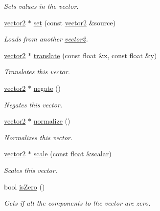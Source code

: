 \begin{DoxyCompactItemize}
\begin{DoxyCompactList}\small\item\em Sets values in the vector. \end{DoxyCompactList}\item 
\hyperlink{classflounder_1_1vector2}{vector2} $\ast$ \hyperlink{classflounder_1_1vector2_a4b553633e18fa6aafc1a5407fcf1e502}{set} (const \hyperlink{classflounder_1_1vector2}{vector2} \&source)
\begin{DoxyCompactList}\small\item\em Loads from another \hyperlink{classflounder_1_1vector2}{vector2}. \end{DoxyCompactList}\item 
\hyperlink{classflounder_1_1vector2}{vector2} $\ast$ \hyperlink{classflounder_1_1vector2_a8795f9c2519a2b0e3da92a06d57e7678}{translate} (const float \&x, const float \&y)
\begin{DoxyCompactList}\small\item\em Translates this vector. \end{DoxyCompactList}\item 
\hyperlink{classflounder_1_1vector2}{vector2} $\ast$ \hyperlink{classflounder_1_1vector2_a0fa7eef12302eaa8cd4f4ff030231e3d}{negate} ()
\begin{DoxyCompactList}\small\item\em Negates this vector. \end{DoxyCompactList}\item 
\hyperlink{classflounder_1_1vector2}{vector2} $\ast$ \hyperlink{classflounder_1_1vector2_a6b47b4d4a39f7a3465e03ee74299ebbe}{normalize} ()
\begin{DoxyCompactList}\small\item\em Normalizes this vector. \end{DoxyCompactList}\item 
\hyperlink{classflounder_1_1vector2}{vector2} $\ast$ \hyperlink{classflounder_1_1vector2_a06efaa630c89a81cda8a8d9d6552e9f8}{scale} (const float \&scalar)
\begin{DoxyCompactList}\small\item\em Scales this vector. \end{DoxyCompactList}\item 
bool \hyperlink{classflounder_1_1vector2_a7d738f56b050996bb46aa76a85d5bdf1}{is\+Zero} ()
\begin{DoxyCompactList}\small\item\em Gets if all the components to the vector are zero. \end{DoxyCompactList}\item 

\end{DoxyCompactItemize}
